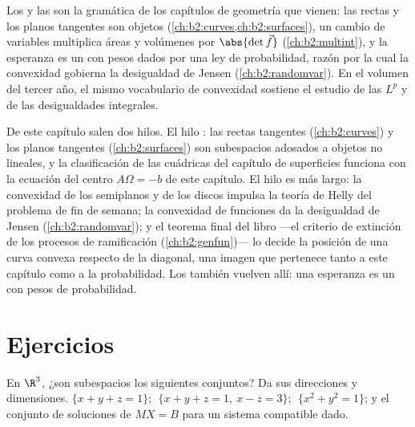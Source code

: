 \begin{remark}
Los  y las  son la gramática de los
capítulos de geometría que vienen: las rectas y los planos tangentes
son objetos  (\cref{ch:b2:curves,ch:b2:surfaces}), un cambio de
variables  multiplica áreas y volúmenes por $\abs{\det \vec f}$
(\cref{ch:b2:multint}), y la esperanza es un  con pesos
dados por una ley de probabilidad, razón por la cual la convexidad
gobierna la desigualdad de Jensen (\cref{ch:b2:randomvar}). En el
volumen del tercer año, el mismo vocabulario de convexidad sostiene
el estudio de las  $L^p$ y de las desigualdades integrales.
\end{remark}

\begin{remark}
De este capítulo salen dos hilos. El hilo \emph{}: las rectas
tangentes (\cref{ch:b2:curves}) y los planos tangentes
(\cref{ch:b2:surfaces}) son subespacios  adosados a objetos no
lineales, y la clasificación de las cuádricas del capítulo de
superficies funciona con la ecuación del centro $A\Omega = -b$ de
este capítulo. El hilo \emph{} es más largo: la convexidad de
los semiplanos y de los discos impulsa la teoría de Helly del
problema de fin de semana; la convexidad de funciones da la
desigualdad de Jensen (\cref{ch:b2:randomvar}); y el teorema final
del libro ---el criterio de extinción de los procesos de ramificación
(\cref{ch:b2:genfun})--- lo decide la posición de una curva convexa
respecto de la diagonal, una imagen que pertenece tanto a este
capítulo como a la probabilidad. Los  también vuelven
allí: una esperanza es un  con pesos de probabilidad.
\end{remark}

\section{Ejercicios}

\begin{exercise}[$\star$]\label{exo:b2:affine:1}
En $\R^3$, ¿son subespacios  los siguientes conjuntos? Da sus
direcciones y dimensiones. $\{x + y + z = 1\}$; $\;\{x + y + z = 1,\
x - z = 3\}$; $\;\{x^2 + y^2 = 1\}$; y el conjunto de soluciones de
$MX = B$ para un sistema compatible dado.
\end{exercise}

